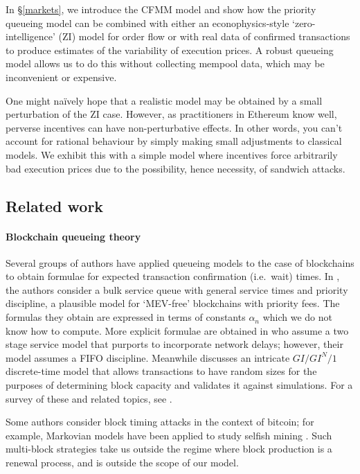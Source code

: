 \documentclass[a4paper,11pt]{article}
\begin{document}
In \S\ref{markets}, we introduce the CFMM model and show how the priority queueing model can be combined with either an econophysics-style `zero-intelligence' (ZI) model for order flow or with real data of confirmed transactions to produce estimates of the variability of execution prices.
%
A robust queueing model allows us to do this without collecting mempool data, which may be inconvenient or expensive.

One might na\"ively hope that a realistic model may be obtained by a small perturbation of the ZI case.
%
However, as practitioners in Ethereum know well, perverse incentives can have non-perturbative effects.
%
In other words, you can't account for rational behaviour by simply making small adjustments to classical models. 
%
We exhibit this with a simple model where incentives force arbitrarily bad execution prices due to the possibility, hence necessity, of sandwich attacks.


\subsection{Related work}
\label{other-work}
\paragraph{Blockchain queueing theory}

Several groups of authors have applied queueing models to the case of blockchains to obtain formulae for expected transaction confirmation (i.e.~wait) times. 
%
In \cite{kasahara2019effect,kawasa2017transaction}, the authors consider a bulk service queue with general service times and priority discipline, a plausible model for `MEV-free' blockchains with priority fees. The formulas they obtain are expressed in terms of constants $\alpha_n$ which we do not know how to compute.
%
More explicit formulae are obtained in \cite{li2018blockchain,li2019markov} who assume a two stage service model that purports to incorporate network delays; however, their model assumes a FIFO discipline.
%
Meanwhile \cite{geissler2019discrete} discusses an intricate $GI/GI^N/1$ discrete-time model that allows transactions to have random sizes for the purposes of determining block capacity and validates it against simulations.
%
For a survey of these and related topics, see \cite{fan2020performance}.

Some authors consider block timing attacks in the context of bitcoin; for example, Markovian models have been applied to study selfish mining \cite{gobel2016bitcoin, javier2020further}.
%
Such multi-block strategies take us outside the regime where block production is a renewal process, and is outside the scope of our model.
\end{document}
